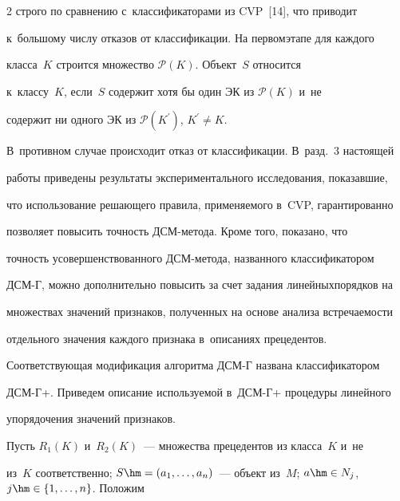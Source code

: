 \begin{multicols}{2}
строго по сравнению с~классификаторами из CVP~[14], что приводит 


к~большому числу отказов от классификации. На первом\linebreak этапе для каждого 


класса~$K$ строится множество $\mathcal{P}(K)$. Объект~$S$ относится 


к~классу~$K$, если~$S$ содержит хотя бы один ЭК из $\mathcal{P}(K)$ и~не 


содержит ни одного ЭК из $\mathcal{P}(K^\prime)$, $K^\prime\not= K$. 


В~противном случае происходит отказ от классификации. В~разд.~3 настоящей 


работы приведены результаты экспериментального исследования, показавшие, 


что использование решающего правила, применяемого в~CVP, гарантированно 


позволяет повысить точность ДСМ-ме\-то\-да. Кроме того, показано, что\linebreak 


точ\-ность усовершенствованного ДСМ-ме\-то\-да, названного классификатором 


\mbox{ДСМ-Г}, мож\-но дополнительно повысить за счет задания \mbox{линейных}\linebreak порядков на 


множествах значений признаков, полученных на основе анализа встре\-ча\-емости 


отдельного значения каждого признака в~описаниях \mbox{прецедентов}. 


Со\-от\-вет\-ст\-ву\-ющая \mbox{модификация} алгоритма \mbox{ДСМ-Г} названа классификатором 


\mbox{ДСМ-Г+}. Приведем описание используемой в~\mbox{ДСМ-Г+} процедуры линейного 


упорядочения значений при\-зна\-ков. 


{ %





}


  


  Пусть $R_1(K)$ и~$R_2(K)$~--- множества прецедентов из класса~$K$ и~не 


из~$K$ соответственно; $S\hm= (a_1,\ldots , a_n)$~--- объект из~$M$; $a\hm\in 


N_j$, $j\hm\in \{1, \ldots,n\}$. Положим 


$$



\end{multicols}
